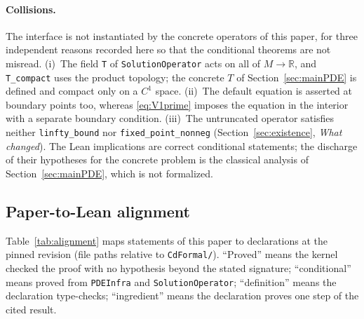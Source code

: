 \documentclass[11pt]{article}
\theoremstyle{plain}
\theoremstyle{definition}
\theoremstyle{remark}
\newcommand{\R}{\mathbb{R}}
\begin{document}
\paragraph{Collisions.} The interface is not instantiated by the concrete operators of this paper, for three independent reasons recorded here so that the conditional theorems are not misread. (i)~The field \texttt{T} of \texttt{SolutionOperator} acts on all of \(M\to\R\), and \texttt{T\_compact} uses the product topology; the concrete \(T\) of Section~\ref{sec:mainPDE} is defined and compact only on a \(C^1\) space. (ii)~The default equation is asserted at boundary points too, whereas \eqref{eq:V1prime} imposes the equation in the interior with a separate boundary condition. (iii)~The untruncated operator satisfies neither \texttt{linfty\_bound} nor \texttt{fixed\_point\_nonneg} (Section~\ref{sec:existence}, \emph{What changed}). The Lean implications are correct conditional statements; the discharge of their hypotheses for the concrete problem is the classical analysis of Section~\ref{sec:mainPDE}, which is not formalized.

\subsection{Paper-to-Lean alignment}
Table~\ref{tab:alignment} maps statements of this paper to declarations at the pinned revision (file paths relative to \texttt{CdFormal/}). ``Proved'' means the kernel checked the proof with no hypothesis beyond the stated signature; ``conditional'' means proved from \texttt{PDEInfra} and \texttt{SolutionOperator}; ``definition'' means the declaration type-checks; ``ingredient'' means the declaration proves one step of the cited result.
\end{document}
